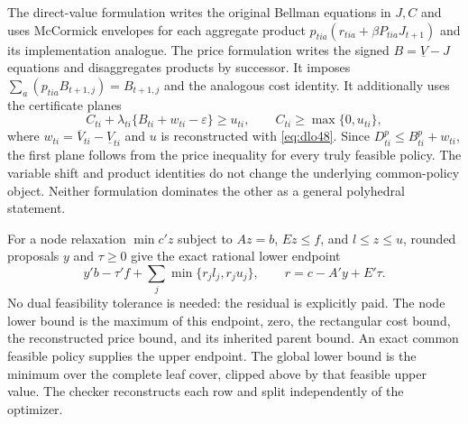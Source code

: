 The direct-value formulation writes the original Bellman equations in $J,C$ and uses McCormick envelopes for each aggregate product $p_{tia}(r_{tia}+\beta P_{tia}J_{t+1})$ and its implementation analogue. The price formulation writes the signed $B=\underline V-J$ equations and disaggregates products by successor. It imposes $\sum_a(p_{tia}B_{t+1,j})=B_{t+1,j}$ and the analogous cost identity. It additionally uses the certificate planes
\begin{equation}\label{eq:planes48}
 C_{ti}+\lambda_{ti}\{B_{ti}+w_{ti}-\varepsilon\}\ge u_{ti},\qquad
 C_{ti}\ge\max\{0,u_{ti}\},
\end{equation}
where $w_{ti}=\overline V_{ti}-\underline V_{ti}$ and $u$ is reconstructed with \eqref{eq:dlo48}. Since $D_{ti}^p\le B_{ti}^p+w_{ti}$, the first plane follows from the price inequality for every truly feasible policy. The variable shift and product identities do not change the underlying common-policy object. Neither formulation dominates the other as a general polyhedral statement.

For a node relaxation $\min c'z$ subject to $Az=b$, $Ez\le f$, and $l\le z\le u$, rounded proposals $y$ and $\tau\ge0$ give the exact rational lower endpoint
\begin{equation}\label{eq:residual48}
 y'b-\tau'f+\sum_j\min\{r_jl_j,r_ju_j\},\qquad r=c-A'y+E'\tau.
\end{equation}
No dual feasibility tolerance is needed: the residual is explicitly paid. The node lower bound is the maximum of this endpoint, zero, the rectangular cost bound, the reconstructed price bound, and its inherited parent bound. An exact common feasible policy supplies the upper endpoint. The global lower bound is the minimum over the complete leaf cover, clipped above by that feasible upper value. The checker reconstructs each row and split independently of the optimizer.


